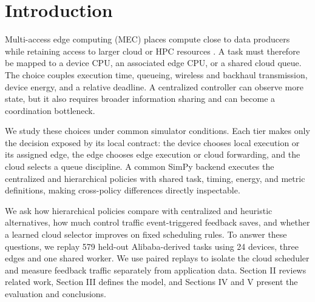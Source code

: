 \section{Introduction}
Multi-access edge computing (MEC) places compute close to data producers while
retaining access to larger cloud or HPC resources \cite{etsiMec003}. A task
must therefore be mapped to a device CPU, an associated edge CPU, or a shared
cloud queue. The choice couples execution time, queueing, wireless and
backhaul transmission, device energy, and a relative deadline. A centralized
controller can observe more state, but it also requires broader information
sharing and can become a coordination bottleneck.

We study these choices under common simulator conditions. Each tier makes only the
decision exposed by its local contract: the device chooses local execution or
its assigned edge, the edge chooses edge execution or cloud forwarding, and
the cloud selects a queue discipline. A common SimPy backend executes the
centralized and hierarchical policies with shared task, timing, energy, and
metric definitions, making cross-policy differences directly inspectable.

We ask how hierarchical policies compare with centralized and heuristic
alternatives, how much control traffic event-triggered feedback saves, and
whether a learned cloud selector improves on fixed scheduling rules.
To answer these questions, we replay 579 held-out Alibaba-derived tasks
using 24 devices, three edges and one shared worker. We use paired replays
to isolate the cloud scheduler and measure feedback traffic separately
from application data. Section II reviews related work, Section III
defines the model, and Sections IV and V present the evaluation and
conclusions.
